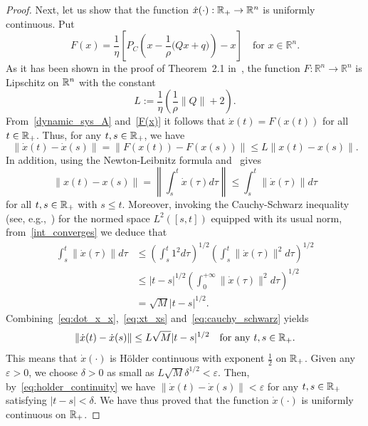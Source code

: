 \documentclass[11pt]{article}
\theoremstyle{definition}
\theoremstyle{remark}
\def\R{\Bbb R}
\begin{document}
\begin{proof}
 Next, let us show that the function $\dot{x}(\cdot):\R_+\to\R^n$ is uniformly continuous. Put \begin{equation}\label{F(x)} F(x)=\dfrac{1}{\eta} \left[P_C\left(x-\dfrac{1}{\rho}\big(Q x+q\big)\right)-x\right]\quad \text{for } x\in \mathbb R^n.\end{equation}  As it has been shown in the proof of Theorem~2.1 in~\cite{pty_2025}, the function $F:\mathbb R^n\to \mathbb R^n$ is Lipschitz on $\R^n$ with the constant $$L:=\dfrac{1}{\eta}\left(\dfrac{1}{\rho}\|Q\|+2\right).$$From~\eqref{dynamic_sys_A} and~\eqref{F(x)} it follows that $\dot{x}(t)=F(x(t))$ for all $t\in\R_+$. Thus, for any $t,s\in \R_+$, we have
\begin{equation}\label{eq:dot_x_x}
	\|\dot{x}(t) - \dot{x}(s)\| = \|F(x(t)) - F(x(s))\| \leq L \|x(t) - x(s)\|.
\end{equation}
In addition, using the Newton-Leibnitz formula  and~\cite[Theorem~4(ii), p.~46]{DU_1977} gives
\begin{equation}\label{eq:xt_xs}	\|x(t) - x(s)\| = \left\| \int_s^t  \dot{x}(\tau) d\tau \right\| \leq \int_s^t  \|\dot{x}(\tau)\| d\tau
\end{equation}
for all $t,s\in\R_+$ with $s\leq t$.
Moreover, invoking the Cauchy-Schwarz inequality (see, e.g.,~\cite[Theorem~1.1, p.~100]{l1987}) for the normed space $L^2([s,t])$ equipped with its usual norm, from~\eqref{int_converges} we deduce that
\begin{equation} \label{eq:cauchy_schwarz}
	\begin{array}{ll}
\displaystyle	\int_s^t   \|\dot{x}(\tau)\| d\tau &\leq \left( \displaystyle\int_s^t  1^2 d\tau \right)^{1/2} \left( \displaystyle\int_s^t \|\dot{x}(\tau)\|^2 d\tau \right)^{1/2} \\
	&\leq  |t-s|^{1/2} \left( \displaystyle\int_0^{+\infty} \|\dot{x}(\tau)\|^2 d\tau \right)^{1/2} \\
	&=\sqrt{M}|t-s|^{1/2}.
	\end{array}
\end{equation}
Combining~\eqref{eq:dot_x_x},~\eqref{eq:xt_xs} and~\eqref{eq:cauchy_schwarz} yields
\begin{equation}\label{eq:holder_continuity}
	\|\dot{x}(t) - \dot{x}(s)\| \leq L  \sqrt{M}  |t-s|^{1/2}\quad {\rm for\ any}\ t,s\in\R_+.
\end{equation}
This means that $\dot{x}(\cdot)$ is H\"{o}lder continuous with exponent $\frac{1}{2}$ on $\R_+$. Given any $\varepsilon>0$, we choose $\delta>0$ as small as $L\sqrt{M}\delta^{1/2}<
\varepsilon$. Then, by~\eqref{eq:holder_continuity} we have $\|\dot{x}(t) - \dot{x}(s)\|<\varepsilon$ for any $t,s\in\R_+$ satisfying $|t-s|<\delta$. We have thus proved that the function $\dot{x}(\cdot)$ is uniformly continuous on $\R_+$.


\end{proof}
\end{document}
